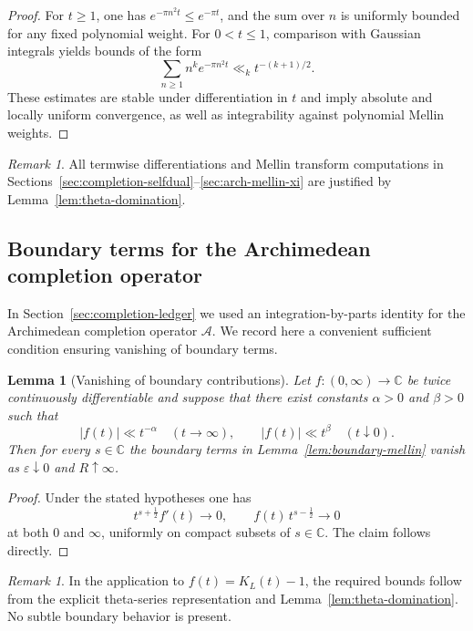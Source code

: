 \documentclass[12pt]{amsart}
\newtheorem{lemma}[theorem]{Lemma}
\theoremstyle{definition}
\theoremstyle{remark}
\newtheorem{remark}[theorem]{Remark}
\begin{document}
\begin{proof}
For $t\ge1$, one has $e^{-\pi n^2 t}\le e^{-\pi t}$, and the sum over $n$ is uniformly
bounded for any fixed polynomial weight. For $0<t\le1$, comparison with Gaussian
integrals yields bounds of the form
\[
\sum_{n\ge1} n^k e^{-\pi n^2 t}\ll_k t^{-(k+1)/2}.
\]
These estimates are stable under differentiation in $t$ and imply absolute and
locally uniform convergence, as well as integrability against polynomial Mellin
weights.
\end{proof}

\begin{remark}
All termwise differentiations and Mellin transform computations in
Sections~\ref{sec:completion-selfdual}--\ref{sec:arch-mellin-xi} are justified by Lemma~\ref{lem:theta-domination}.
\end{remark}

\subsection{Boundary terms for the Archimedean completion operator}
\label{app:boundary}

In Section~\ref{sec:completion-ledger} we used an integration-by-parts identity for the Archimedean
completion operator $\mathcal A$. We record here a convenient sufficient condition
ensuring vanishing of boundary terms.

\begin{lemma}[Vanishing of boundary contributions]
\label{lem:boundary-vanish}
Let $f:(0,\infty)\to\mathbb C$ be twice continuously differentiable and suppose that
there exist constants $\alpha>0$ and $\beta>0$ such that
\[
|f(t)|\ll t^{-\alpha}\quad (t\to\infty),
\qquad
|f(t)|\ll t^{\beta}\quad (t\downarrow 0).
\]
Then for every $s\in\mathbb C$ the boundary terms in
Lemma~\ref{lem:boundary-mellin} vanish as $\varepsilon\downarrow0$ and $R\uparrow\infty$.
\end{lemma}

\begin{proof}
Under the stated hypotheses one has
\[
t^{s+\frac12}f'(t)\to0,
\qquad
f(t)\,t^{s-\frac12}\to0
\]
at both $0$ and $\infty$, uniformly on compact subsets of $s\in\mathbb C$. The claim
follows directly.
\end{proof}

\begin{remark}
In the application to $f(t)=K_L(t)-1$, the required bounds follow from the explicit
theta-series representation and Lemma~\ref{lem:theta-domination}. No subtle boundary
behavior is present.
\end{remark}
\end{document}
